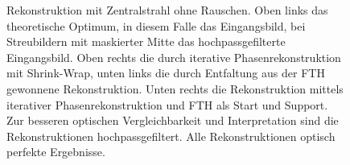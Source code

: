 \begin{figure}
	\caption[2D Rekonstruktion: Ideal]{Rekonstruktion mit Zentralstrahl ohne Rauschen. Oben links das theoretische Optimum, in diesem Falle das Eingangsbild, bei Streubildern mit maskierter Mitte das hochpassgefilterte Eingangsbild. Oben rechts die durch iterative Phasenrekonstruktion mit Shrink-Wrap, unten links die durch Entfaltung  aus der FTH gewonnene Rekonstruktion. Unten rechts die Rekonstruktion mittels iterativer Phasenrekonstruktion und FTH als Start und Support. Zur besseren optischen Vergleichbarkeit und Interpretation sind die Rekonstruktionen hochpassgefiltert. Alle Rekonstruktionen optisch perfekte Ergebnisse.}
	\label{fig:recon2d-perfect}
\end{figure}

